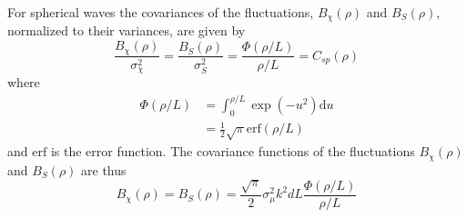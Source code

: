 For spherical waves the covariances of the fluctuations, $B_{\chi}(\rho)$ and
$B_{S}(\rho)$, normalized to their variances, are given by
\begin{equation}\label{eq:theory:propagation:turbulence:correlation}
 \frac{B_{\chi} (\rho)}{\sigma_{\chi}^2} = \frac{B_{S} (\rho)}{\sigma_{S}^2} = \frac{\Phi\left(\rho/L\right)}{\rho/L} = C_{sp}(\rho)
\end{equation}
where
\begin{align}\label{eq:gaussian_correlation}
 \Phi \left(\rho/L \right) &= \int_0^{\rho/L} \exp{\left(-u^2\right)} \mathrm{d} u  \\
 &= \frac{1}{2} \sqrt{\pi} \mathrm{erf}\left( \rho/L \right)
\end{align}
and $\mathrm{erf}$ is the error function.
The covariance functions of the fluctuations $B_{\chi}(\rho)$ and $B_{S}(\rho)$ are thus
\begin{equation}\label{eq:variances}
 B_{\chi} (\rho) = B_{S}(\rho) = \frac{\sqrt{\pi}}{2} \sigma_{\mu}^2 k^2 d L
\frac{\Phi(\rho/L) }{\rho / L}
\end{equation}

